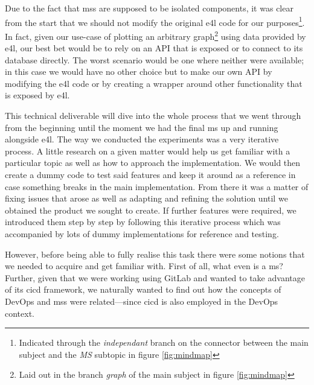 
Due to the fact that \glspl{ms} are supposed to be isolated
components, it was clear from the start that we should not modify the
original \gls{e4l} code for our purposes\footnote{Indicated through
the \textit{independant} branch on the connector between the main subject
and the \textit{MS} subtopic in figure \ref{fig:mindmap}}. In fact, given our use-case
of plotting an arbitrary graph\footnote{Laid out in the branch
\textit{graph} of the main subject in figure \ref{fig:mindmap}} using data provided by \gls{e4l}, our
best bet would be to rely on an API that is exposed or to connect to
its database directly. The worst scenario would be one where neither
were available; in this case we would have no other choice but
to make our own API by modifying the \gls{e4l} code or by creating a
wrapper around other functionality that is exposed by \gls{e4l}.

This technical deliverable will dive into the whole process that we
went through from the beginning until the moment we had the final
\gls{ms} up and running alongside \gls{e4l}. The way we conducted the
experiments was a very iterative process. A little
research on a given matter would help us get familiar with a
particular topic as well as how to approach the implementation. We
would then create a dummy code to test said features and keep it
around as a reference in case something breaks in the main
implementation. From there it was a matter of fixing issues that arose
as well as adapting and refining the solution until we obtained the
product we sought to create. If further features were required, we
introduced them step by step by following this iterative process which
was accompanied by lots of dummy implementations for reference and
testing.


However, before being able to fully realise this task there were some
notions that we needed to acquire and get familiar with. First of all,
what even is a \gls{ms}? Further, given that we were working using
GitLab and wanted to take advantage of its \gls{cicd} framework, we
naturally wanted to find out how the concepts of DevOps and \glspl{ms}
were related---since \gls{cicd} is also employed in the DevOps context.



